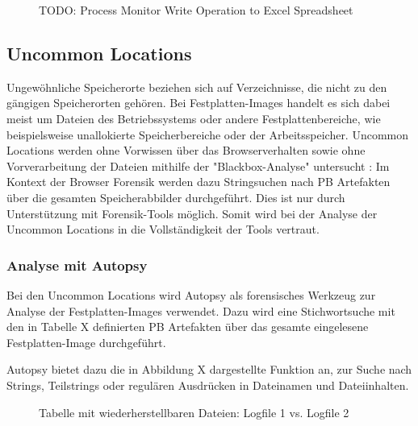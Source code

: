 \begin{figure}[h!]
	\centering
	\small
	\centerline{\resizebox{\linewidth}{!}{}}
	\caption{TODO: Process Monitor Write Operation to Excel Spreadsheet}
	\label{fig:jes}
\end{figure}

\subsection{Uncommon Locations}
Ungewöhnliche Speicherorte beziehen sich auf Verzeichnisse, die nicht zu den gängigen Speicherorten gehören. 
Bei Festplatten-Images handelt es sich dabei meist um Dateien des Betriebssystems oder andere Festplattenbereiche, wie beispielsweise unallokierte Speicherbereiche oder der Arbeitsspeicher.
Uncommon Locations werden ohne Vorwissen über das Browserverhalten sowie ohne Vorverarbeitung der Dateien mithilfe der "Blackbox-Analyse" untersucht \cite{Bonetti.2014}:
Im Kontext der Browser Forensik werden dazu Stringsuchen nach PB Artefakten über die gesamten Speicherabbilder durchgeführt.
Dies ist nur durch Unterstützung mit Forensik-Tools möglich. Somit wird bei der Analyse der Uncommon Locations in die Vollständigkeit der Tools vertraut.

\subsubsection*{Analyse mit Autopsy}
Bei den Uncommon Locations wird Autopsy als forensisches Werkzeug zur Analyse der Festplatten-Images verwendet.
Dazu wird eine Stichwortsuche mit den in Tabelle X definierten PB Artefakten über das gesamte eingelesene Festplatten-Image durchgeführt.

Autopsy bietet dazu die in Abbildung X dargestellte Funktion an, zur Suche nach Strings, Teilstrings oder regulären Ausdrücken in Dateinamen und Dateiinhalten.
\begin{figure}[h!]
	\centerline{}
	\caption{Tabelle mit wiederherstellbaren Dateien: Logfile 1 vs. Logfile 2}
\end{figure}

